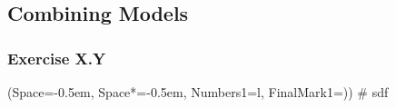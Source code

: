 \documentclass[12pt, a4paper]{article}
\newcommand{\listSpace}{-0.5em}%
\begin{document}
\subsection{Combining Models}
\subsubsection*{Exercise X.Y}
\begin{easylist}[enumerate]
	\ListProperties(Space=\listSpace, Space*=\listSpace, Numbers1=l, FinalMark1={)})
	# sdf
\end{easylist}





































\end{document}
